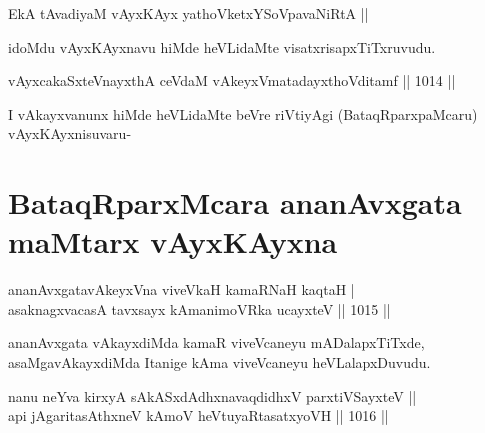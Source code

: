 \begin{shl}
EkA tAvadiyaM vAyxKAyx yathoVketxYSoVpavaNiRtA || 
\end{shl}

\begin{artha}
idoMdu vAyxKAyxnavu hiMde heVLidaMte visatxrisapxTiTxruvudu.
\end{artha}


\begin{shl}
vAyxcakaSxteV\s nayxthA ceVdaM vAkeyxVmatadayxthoVditamf ||  1014 || \\
\end{shl}

\begin{artha}
I vAkayxvanunx hiMde heVLidaMte beVre riVtiyAgi (BataqRparxpaMcaru) vAyxKAyxnisuvaru-
\end{artha}

\section*{BataqRparxMcara ananAvxgata maMtarx vAyxKAyxna}


\begin{shl}
ananAvxgatavAkeyxVna viveVkaH kamaRNaH kaqtaH | \\
asaknagxvacasA tavxsayx kAmanimoVRka ucayxteV \hfill ||  1015 ||
\end{shl}

\begin{artha}
ananAvxgata vAkayxdiMda kamaR viveVcaneyu mADalapxTiTxde, asaMgavAkayxdiMda Itanige kAma viveVcaneyu heVLalapxDuvudu.
\end{artha}


\begin{shl}
nanu \footnotemark[1]neYva kirxyA sAkASxdAdhxnavaqdidhxV parxtiVSayxteV ||\\  
api jAgaritasAthxneV kAmoV heVtuyaRtasatxyoVH \hfill||  1016 ||
\end{shl}

